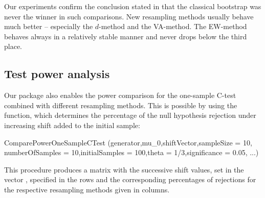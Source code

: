Our experiments confirm the conclusion stated in \citep{grzegorzewski_amcs2020} that the classical bootstrap was never the winner in such comparisons. New resampling methods usually behave much better -- especially the $d$-method and the VA-method. The EW-method behaves always in a relatively stable manner and never drops below the third place.




\subsection{Test power analysis}


Our package also enables  the power comparison for the one-sample C-test combined with different resampling methods. This is possible by using the  function, which determines the percentage of the null hypothesis rejection under increasing shift added to the initial sample:
\begin{example}
ComparePowerOneSampleCTest (generator,mu_0,shiftVector,sampleSize = 10,
 numberOfSamples = 10,initialSamples = 100,theta = 1/3,significance = 0.05, ...)
\end{example}
This procedure produces a matrix with the successive shift values, set in the vector , specified in the rows and the corresponding percentages of rejections for the respective resampling methods given in columns.

